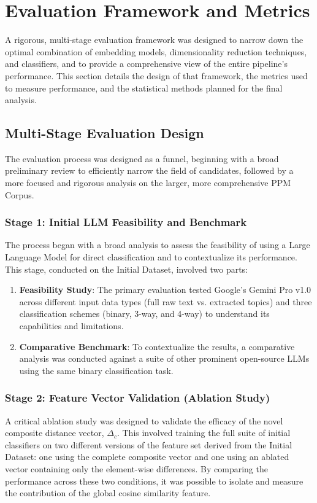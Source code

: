 \section{Evaluation Framework and Metrics}\label{ch:3.4}
A rigorous, multi-stage evaluation framework was designed to narrow down the optimal combination of embedding models, dimensionality reduction techniques, and classifiers, and to provide a comprehensive view of the entire pipeline's performance. This section details the design of that framework, the metrics used to measure performance, and the statistical methods planned for the final analysis.

\subsection{Multi-Stage Evaluation Design}\label{ch:3.4.1}
The evaluation process was designed as a funnel, beginning with a broad preliminary review to efficiently narrow the field of candidates, followed by a more focused and rigorous analysis on the larger, more comprehensive PPM Corpus.

\subsubsection{Stage 1: Initial LLM Feasibility and Benchmark}
The process began with a broad analysis to assess the feasibility of using a Large Language Model for direct classification and to contextualize its performance. This stage, conducted on the Initial Dataset, involved two parts:
\begin{enumerate}
    \item \textbf{Feasibility Study}: The primary evaluation tested Google's Gemini Pro v1.0 across different input data types (full raw text vs. extracted topics) and three classification schemes (binary, 3-way, and 4-way) to understand its capabilities and limitations.
    \item \textbf{Comparative Benchmark}: To contextualize the results, a comparative analysis was conducted against a suite of other prominent open-source LLMs using the same binary classification task.
\end{enumerate}

\subsubsection{Stage 2: Feature Vector Validation (Ablation Study)}\label{ch:3.4.1.1}
A critical ablation study was designed to validate the efficacy of the novel composite distance vector, \(\Delta_c\). This involved training the full suite of initial classifiers on two different versions of the feature set derived from the Initial Dataset: one using the complete composite vector and one using an ablated vector containing only the element-wise differences. By comparing the performance across these two conditions, it was possible to isolate and measure the contribution of the global cosine similarity feature.

